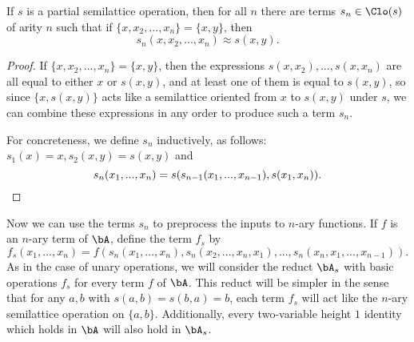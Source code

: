 \begin{prop}\label{higher-semilattice} If $s$ is a partial semilattice operation, then for all $n$ there are terms $s_n \in \Clo(s)$ of arity $n$ such that if $\{x,x_2, ..., x_n\} = \{x,y\}$, then
\[
s_n(x,x_2, ..., x_n) \approx s(x,y).
\]
\end{prop}
\begin{proof} If $\{x,x_2, ..., x_n\} = \{x,y\}$, then the expressions $s(x,x_2), ..., s(x,x_n)$ are all equal to either $x$ or $s(x,y)$, and at least one of them is equal to $s(x,y)$, so since $\{x,s(x,y)\}$ acts like a semilattice oriented from $x$ to $s(x,y)$ under $s$, we can combine these expressions in any order to produce such a term $s_n$.

For concreteness, we define $s_n$ inductively, as follows: $s_1(x) = x, s_2(x,y) = s(x,y)$ and
\[
s_n(x_1, ..., x_n) = s(s_{n-1}(x_1, ..., x_{n-1}), s(x_1,x_n)).\qedhere
\]
\end{proof}

Now we can use the terms $s_n$ to preprocess the inputs to $n$-ary functions. If $f$ is an $n$-ary term of $\bA$, define the term $f_s$ by
\[
f_s(x_1, ..., x_n) = f(s_n(x_1, ..., x_n), s_n(x_2, ..., x_n, x_1), ..., s_n(x_n, x_1, ..., x_{n-1})).
\]
As in the case of unary operations, we will consider the reduct $\bA_s$ with basic operations $f_s$ for every term $f$ of $\bA$. This reduct will be simpler in the sense that for any $a,b$ with $s(a,b) = s(b,a) = b$, each term $f_s$ will act like the $n$-ary semilattice operation on $\{a,b\}$. Additionally, every two-variable height $1$ identity which holds in $\bA$ will also hold in $\bA_s$.

